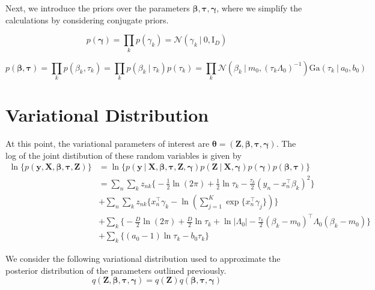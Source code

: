 \documentclass[twoside,11pt]{article}
\newcommand{\eye}{\mathrm{I}}
\newcommand\given[1][]{\:#1\vert\:}
\newcommand{\transpose}[1]{#1^{\intercal}}
\newcommand{\kprod}{\prod_{k}}
\newcommand{\nsum}{\sum_{n}}
\newcommand{\ksum}{\sum_{k}}
\newcommand{\boldbeta}{\boldsymbol\beta}
\newcommand{\boldgamma}{\boldsymbol\gamma}
\newcommand{\boldtau}{\boldsymbol\tau}
\newcommand{\sumexp}{\sum_{j=1}^{K} \exp \{ \transpose{x_n} \gamma_j \}}
\newcommand{\pr}[1]{p \left( #1 \right)}
\begin{document}
Next, we introduce the priors over the parameters $\boldbeta, \boldtau, \boldgamma$, where we simplify the calculations by considering conjugate priors. 

\begin{equation} \label{eq:gamma_prior}
	 p(\boldgamma) = \kprod p(\gamma_k) = \mathcal{N} \left( \gamma_k \given 0, \eye_D \right)
\end{equation}

\begin{equation} \label{eq:betatau_prior}
	 p\left( \boldbeta, \boldtau \right) = \prod_{k} p(\beta_k, \tau_k) = \kprod p(\beta_k \given \tau_k) p(\tau_k) = 
	 \kprod \mathcal{N} \left( \beta_k \given m_0, (\tau_k \Lambda_0)^{-1} \right) \mathrm{Ga} \left( \tau_k \given a_0, b_0 \right)
\end{equation}


\section{Variational Distribution}
At this point, the variational parameters of interest are $\boldsymbol \theta = (\mathbf{Z}, \boldbeta, \boldtau, \boldgamma)$. The log of the joint distibution of these random variables is given by
\begin{equation} \label{eq:joint}
\begin{split}
	\ln \bigg\{ \pr{\mathbf{y}, \mathbf{X}, \boldbeta, \boldtau, \mathbf{Z}} \bigg\} &= 
	\ln \bigg\{\pr{\mathbf{y} \given \mathbf{X}, \boldsymbol\beta, \boldsymbol{\tau}, \mathbf{Z}, \boldsymbol\gamma}\pr{\mathbf{Z}\given \mathbf{X}, \boldgamma}\pr{\boldgamma}\pr{\boldbeta, \boldtau} \bigg\}\\
	&= \nsum \ksum z_{nk}\bigg\{ -\frac{1}{2}\ln(2\pi) + \frac{1}{2} \ln \tau_k - \frac{\tau_k}{2} \left( y_n - \transpose{x_n}\beta_k\right)^2 \bigg\} \\
	& + \nsum \ksum z_{nk} \bigg\{ \transpose{x_n} \gamma_k - \ln\left( \sumexp \right) \bigg\} \\
	& + \ksum  \bigg\{ -\frac{D}{2} \ln (2\pi) + \frac{D}{2} \ln \tau_k + \ln | \Lambda_0| - \frac{\tau_k}{2}\transpose{(\beta_k - m_0)} \Lambda_0 (\beta_k - m_0)\bigg\} \\
	& + \ksum \bigg\{ (a_0 - 1) \ln \tau_k - b_0 \tau_k \bigg\}
\end{split}
\end{equation}

We consider the following variational distribution used to approximate the posterior distribution of the parameters outlined previously.
\begin{equation} \label{eq:variational}
	q \left( \mathbf{Z}, \boldbeta, \boldtau, \boldgamma \right) = q(\mathbf{Z}) q(\boldbeta, \boldtau, \boldgamma)
\end{equation}
\end{document}
